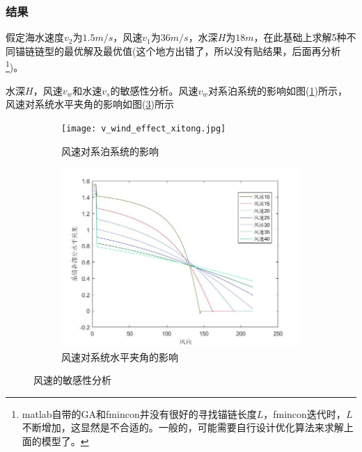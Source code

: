         \subsubsection{结果}
            \par
            假定海水速度$v_2$为$1.5m/s$，风速$v_1$为$36m/s$，水深$H$为$18m$，在此基础上求解5种不同锚链链型的最优解及最优值(这个地方出错了，所以没有贴结果，后面再分析\footnote{matlab自带的GA和fmincon并没有很好的寻找锚链长度$L$，fmincon迭代时，$L$不断增加，这显然是不合适的。一般的，可能需要自行设计优化算法来求解上面的模型了。})。
            \par
            水深$H$，风速$v_w$和水速$v_s$的敏感性分析。风速$v_w$对系泊系统的影响如图(\ref{风速对系泊系统的影响})所示，风速对系统水平夹角的影响如图(\ref{风速对系统水平夹角的影响})所示
            \begin{figure}[H]
                \centering
                \begin{subfigure}[b]{0.4\textwidth}
                    \texttt{[image: v\_wind\_effect\_xitong.jpg]}
                    \caption{风速对系泊系统的影响}
                    \label{风速对系泊系统的影响}
                \end{subfigure}
                \begin{subfigure}[b]{0.4\textwidth}
                    \includegraphics[width=\textwidth]{images/v_wind_effect_alpha2.jpg}
                    \caption{风速对系统水平夹角的影响}
                    \label{风速对系统水平夹角的影响}
                \end{subfigure}
                \caption{风速的敏感性分析}
            \end{figure}

